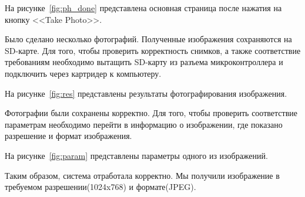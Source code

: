 На рисунке~\ref{fig:ph_done} представлена основная страница после нажатия на 
кнопку <<Take Photo>>.    


    Было сделано несколько фотографий. Полученные изображения
сохраняются на SD-карте. Для того,
чтобы проверить корректность снимков, а также соответствие 
требованиям необходимо вытащить SD-карту из разъема 
микроконтроллера и подключить через картридер к компьютеру.

На рисунке~\ref{fig:res} представлены результаты фотографирования изображения.    


    Фотографии были сохранены корректно. Для того, чтобы 
проверить соответствие параметрам необходимо перейти в
информацию о изображении, где показано разрешение и
формат изображения.

На рисунке~\ref{fig:param} представлены параметры одного из изображений.    


    Таким образом, система отработала корректно. Мы получили 
изображение в требуемом разрешении(1024x768) и формате(JPEG).
